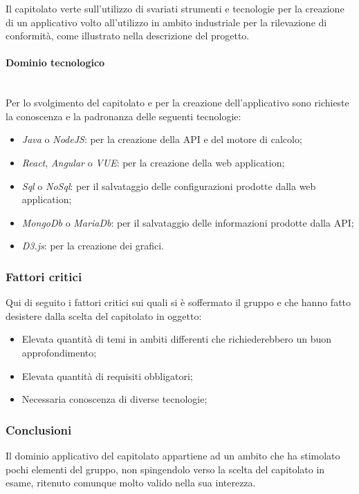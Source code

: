 \documentclass[11pt]{article}
\begin{document}
		\noindent
        Il capitolato verte sull'utilizzo di svariati strumenti e tecnologie per la creazione di un applicativo volto all'utilizzo
        in ambito industriale per la rilevazione di conformità, come illustrato nella descrizione del progetto.
        
        \paragraph{Dominio tecnologico}~\\

		\noindent
        Per lo svolgimento del capitolato e per la creazione dell'applicativo sono richieste la conoscenza e la padronanza delle
        seguenti tecnologie:
        \begin{itemize}
            \item \textit{Java} o \textit{NodeJS}: per la creazione della API e del motore di calcolo;
            \item \textit{React}, \textit{Angular} o \textit{VUE}: per la creazione della web application;
            \item \textit{Sql} o \textit{NoSql}: per il salvataggio delle configurazioni prodotte dalla web application;
            \item \textit{MongoDb} o \textit{MariaDb}: per il salvataggio delle informazioni prodotte dalla API;
            \item \textit{D3.js}: per la creazione dei grafici.
        \end{itemize}
    
    \subsubsection{Fattori critici}
    Qui di seguito i fattori critici sui quali si è soffermato il gruppo e che hanno fatto desistere dalla scelta del capitolato in
    oggetto:
    \begin{itemize}
    	\item Elevata quantità di temi in ambiti differenti che richiederebbero un buon approfondimento;
    	\item Elevata quantità di requisiti obbligatori;
    	\item Necessaria conoscenza di diverse tecnologie;
    \end{itemize}
    
    \subsubsection{Conclusioni}
    Il dominio applicativo del capitolato appartiene ad un ambito che ha stimolato pochi elementi del gruppo, non spingendolo
    verso la scelta del capitolato in esame, ritenuto comunque molto valido nella sua interezza.
    
\end{document}

